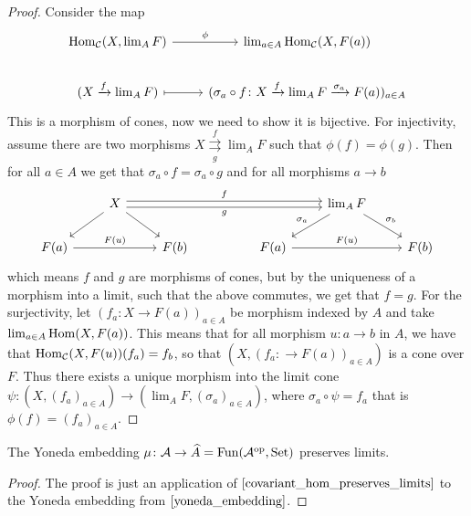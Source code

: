 \begin{proof}
    Consider the map
    \[
    \begin{tikzcd}
        \Hom_{\mathcal{C}}(X, \lim_A F) 
        \arrow[r, "\phi"]
        &
        \lim_{a \in A} \Hom_{\mathcal{C}} ( X, F(a)) 
        \\
        (X \xrightarrow{f} \lim_A F) 
        \arrow[r, mapsto]
        &
        (\sigma_a  \circ f\colon X \xrightarrow{f} \lim_A F \xrightarrow{\sigma_a} F(a))_{a \in A}
    \end{tikzcd}
    \]
    This is a morphism of cones, now we need to show it is bijective.
    For injectivity, assume there are two morphisms $ X \underset{g}{\overset{f}{{\rightrightarrows}}} \lim_A F$ such that $\phi(f)=\phi(g)$.
    Then for all $a \in A$ we get that $\sigma_a \circ f = \sigma_a \circ g$ and for all morphisms $a \to b$
    \[
    \begin{tikzcd}
        &
        X
        \arrow[rrrr, shift left , "f"]
        \arrow[rrrr, shift right, "g"']
        \arrow[ld]
        \arrow[rd]
        &
        &
        &
        &
        \lim_A F
        \arrow[ld, "\sigma_a"']
        \arrow[rd, "\sigma_b"]
        &
        \\
        F(a)
        \arrow[rr, "F(u)"]
        &
        &
        F(b)
        &
        &
        F(a)
        \arrow[rr ,"F(u)"]
        &
        &
        F(b)
    \end{tikzcd}
    \]
    which means $f$ and $g$ are morphisms of cones, but by the uniqueness of a morphism into a limit, such that the above commutes, we get that $f=g$.
    For the surjectivity, let $(f_a \colon X \to F(a))_{a\in A}$ be morphism indexed by $A$ and take $\lim_{a \in A} \operatorname{Hom}( X, F(a))$.
    This means that for all morphism $u \colon a  \to  b$ in $A$, we have that $\operatorname{Hom}_{\mathcal{C}}(X,F(u))(f_a)=f_b$,
    so that $(X, (f_a \colon \to F(a))_{a \in A})$ is a cone over $F$.
    Thus there exists a unique morphism into the limit cone $\psi: (X,(f_a)_{a \in A}) \to ( \lim_A F, (\sigma_a)_{a \in A})$, where $\sigma_a \circ \psi =f_a$ that is $\phi(f)= (f_a)_{a \in A}$.
\end{proof}

\begin{thm}
    The Yoneda embedding $\mu \colon \mathcal{A} \to \widehat{A} = \operatorname{Fun} ( \mathcal{A}^{\operatorname{op}}, \operatorname{Set} )$ preserves limits.
\end{thm}

\begin{proof}
    The proof is just an application of $\cref{covariant_hom_preserves_limits}$ to the Yoneda embedding from $\cref{yoneda_embedding}$.
\end{proof}

